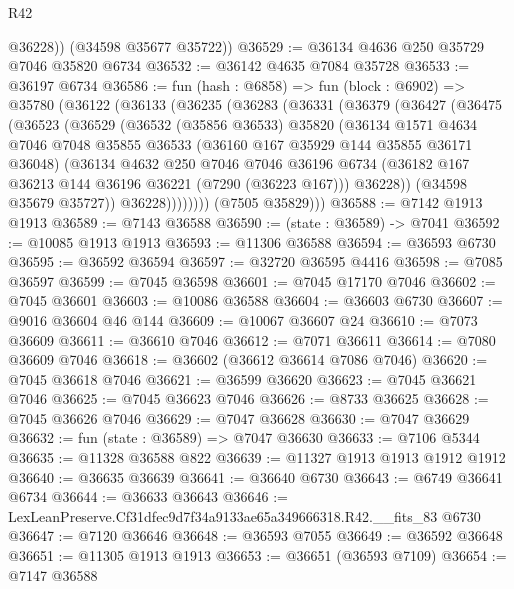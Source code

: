 \begin{lexlean}{R42}
\begin{coremodule}
{          @36228))
      (@34598 @35677 @35722))
@36529 := @36134 @4636 @250 @35729 @7046 @35820 @6734
@36532 := @36142 @4635 @7084 @35728
@36533 := @36197 @6734
@36586 := fun (hash : @6858) =>
  fun (block : @6902) =>
  @35780
    (@36122
      (@36133
        (@36235
          (@36283
            (@36331
              (@36379
                (@36427
                  (@36475
                    (@36523
                      (@36529
                        (@36532
                          (@35856 @36533)
                          @35820
                          (@36134
                            @1571
                            @4634
                            @7046
                            @7048
                            @35855
                            @36533
                            (@36160 @167 @35929 @144 @35855 @36171 @36048)
                            (@36134
                              @4632
                              @250
                              @7046
                              @7046
                              @36196
                              @6734
                              (@36182 @167 @36213 @144 @36196 @36221 (@7290 (@36223 @167)))
                              @36228))
                          (@34598 @35679 @35727))
                        @36228))))))))
        (@7505 @35829)))
@36588 := @7142 @1913 @1913
@36589 := @7143 @36588
@36590 := (state : @36589) -> @7041
@36592 := @10085 @1913 @1913
@36593 := @11306 @36588
@36594 := @36593 @6730
@36595 := @36592 @36594
@36597 := @32720 @36595 @4416
@36598 := @7085 @36597
@36599 := @7045 @36598
@36601 := @7045 @17170 @7046
@36602 := @7045 @36601
@36603 := @10086 @36588
@36604 := @36603 @6730
@36607 := @9016 @36604 @46 @144
@36609 := @10067 @36607 @24
@36610 := @7073 @36609
@36611 := @36610 @7046
@36612 := @7071 @36611
@36614 := @7080 @36609 @7046
@36618 := @36602 (@36612 @36614 @7086 @7046)
@36620 := @7045 @36618 @7046
@36621 := @36599 @36620
@36623 := @7045 @36621 @7046
@36625 := @7045 @36623 @7046
@36626 := @8733 @36625
@36628 := @7045 @36626 @7046
@36629 := @7047 @36628
@36630 := @7047 @36629
@36632 := fun (state : @36589) => @7047 @36630
@36633 := @7106 @5344
@36635 := @11328 @36588 @822
@36639 := @11327 @1913 @1913 @1912 @1912
@36640 := @36635 @36639
@36641 := @36640 @6730
@36643 := @6749 @36641 @6734
@36644 := @36633 @36643
@36646 := LexLeanPreserve.Cf31dfec9d7f34a9133ae65a349666318.R42.__fits_83 @6730
@36647 := @7120 @36646
@36648 := @36593 @7055
@36649 := @36592 @36648
@36651 := @11305 @1913 @1913
@36653 := @36651 (@36593 @7109)
@36654 := @7147 @36588
}
\end{coremodule}
\end{lexlean}
